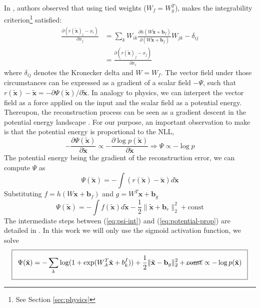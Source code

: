 In \citep{potentialenergy}, authors observed that using tied weights ($W_f = W_g^T$), makes the integrability criterion\footnote{See Section \ref{sec:physics}} satisfied:
\begin{equation}
\begin{split}
\frac{\partial(r(\tilde{\mathbf{x}})_i- x_i)}{\partial x_j} &=  \sum_k W_{ik} \frac{\partial h(W\tilde{\mathbf{x}} + \mathbf{b}_f)}{\partial(W\tilde{\mathbf{x}} + \mathbf{b}_f)}W_{jk} - \delta_{ij}   \\
&= \frac{\partial(r(\tilde{\mathbf{x}})_j- x_j)}{\partial x_i}
\end{split}
\end{equation} 
where $\delta_{ij}$ denotes the Kronecker delta and $W=W_f$. The vector field under those circumstances can be expressed as a gradient of a scalar field $-\Psi$, such that $r(\tilde{\mathbf{x}}) - \tilde{\mathbf{x}} = -\partial \Psi(\tilde{\mathbf{x}})/\partial \tilde{\mathbf{x}}$. In analogy to physics, we can interpret the vector field as a force applied on the input and the scalar field as a potential energy. Thereupon, the reconstruction process can be seen as a gradient descent in the potential energy landscape \citep{potentialenergy}. For our purpose, an important observation to make is that the potential energy is proportional to the NLL,
\begin{equation}
-\frac{\partial \Psi(\tilde{\mathbf{x}})}{\partial \tilde{\mathbf{x}}} \propto -\frac{\partial \log p(\tilde{\mathbf{x}})}{\partial \tilde{\mathbf{x}}} \Rightarrow  \Psi \propto -\log p
\end{equation}
The potential energy being the gradient of the reconstruction error, we can compute $\Psi$ as
\begin{equation}
 \Psi(\tilde{\mathbf{x}}) = -\int (r(\tilde{\mathbf{x}}) - \tilde{\mathbf{x}})d\tilde{\mathbf{x}} 
 \label{eq:psi-int}
\end{equation}
Substituting $f = h(W\mathbf{x} + \mathbf{b}_f)$ and $g = W^T\mathbf{x} + \mathbf{b}_g$
\begin{equation}
\Psi(\tilde{\mathbf{x}})= -\int f(\tilde{\mathbf{x}})d\tilde{\mathbf{x}} - \frac{1}{2} \lVert \tilde{\mathbf{x}} + \textbf{b}_r \rVert_2^2 + \text{const}
\end{equation} 
The intermediate steps between (\ref{eq:psi-int}) and (\ref{eq:potential-prop}) are detailed in \citep{potentialenergy}. In this work we will only use the sigmoid activation function, we solve
\newcommand\boxedB[1]{{\setlength\fboxsep{8pt}\boxed{#1}}}
\begin{equation}
\boxedB{\Psi(\tilde{\mathbf{x}}) =  -\sum_k \log(1 + \text{exp}(W_{.k}^T \tilde{\mathbf{x}} + b_k^f)) + \frac{1}{2} \lVert \tilde{\mathbf{x}} - \textbf{b}_g \rVert_2^2 + \cancel{\text{const}} \propto -\log p(\tilde{\mathbf{x}})}
\label{eq:potential-prop}
\end{equation}
